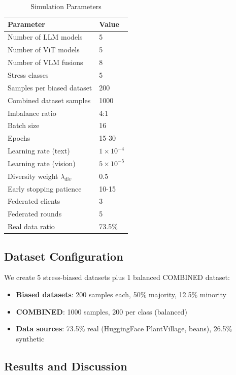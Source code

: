 \documentclass[journal]{IEEEtran}
\begin{document}
\begin{table}[!t]
\caption{Simulation Parameters}
\label{tab:sim_params}
\centering
\begin{tabular}{@{}ll@{}}
\toprule
\textbf{Parameter} & \textbf{Value} \\
\midrule
Number of LLM models & 5 \\
Number of ViT models & 5 \\
Number of VLM fusions & 8 \\
Stress classes & 5 \\
Samples per biased dataset & 200 \\
Combined dataset samples & 1000 \\
Imbalance ratio & 4:1 \\
Batch size & 16 \\
Epochs & 15-30 \\
Learning rate (text) & $1 \times 10^{-4}$ \\
Learning rate (vision) & $5 \times 10^{-5}$ \\
Diversity weight $\lambda_{div}$ & 0.5 \\
Early stopping patience & 10-15 \\
Federated clients & 3 \\
Federated rounds & 5 \\
Real data ratio & 73.5\% \\
\bottomrule
\end{tabular}
\end{table}

\subsection{Dataset Configuration}

We create 5 stress-biased datasets plus 1 balanced COMBINED dataset:
\begin{itemize}
    \item \textbf{Biased datasets}: 200 samples each, 50\% majority, 12.5\% minority
    \item \textbf{COMBINED}: 1000 samples, 200 per class (balanced)
    \item \textbf{Data sources}: 73.5\% real (HuggingFace PlantVillage, beans), 26.5\% synthetic
\end{itemize}

\subsection{Results and Discussion}
\end{document}
